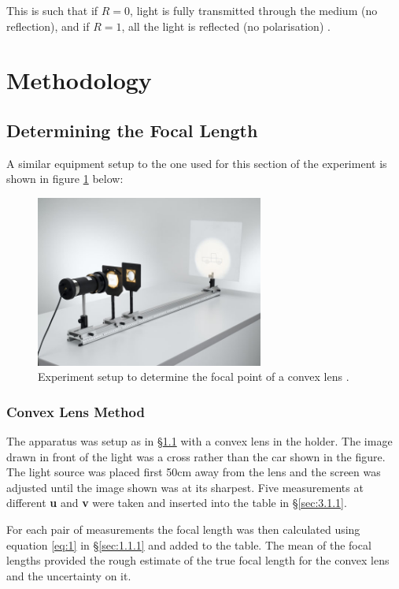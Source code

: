 \documentclass[12pt]{article}
\begin{document}
\vspace{.5cm}

This is such that if $R=0$, light is fully transmitted through the medium (no reflection), and if $R=1$, all the light is reflected (no polarisation)
\cite{UCDlens}.

\section{Methodology} \label{sec:2}

\subsection{Determining the Focal Length} \label{sec:2.1}

A similar equipment setup to the one used for this section of the experiment is shown in figure \ref{fig:lensexp} below:

\begin{figure}[H]
    \centering
    \includegraphics[width=7.5cm]{lens exp setup.jpg}
    \caption{\centering Experiment setup to determine the focal point of a convex lens \protect\cite{leyboldexp}.}
    \label{fig:lensexp}
\end{figure}

\subsubsection{Convex Lens Method} \label{sec:2.1.1}

The apparatus was setup as in §\ref{sec:2.1} with a convex lens in the holder. The image drawn in front of the light was a cross rather than the car shown in the figure.
The light source was placed first 50cm away from the lens and the screen was adjusted until the image shown was at its sharpest.
Five measurements at different \textbf{u} and \textbf{v} were taken and inserted into the table in §\ref{sec:3.1.1}.

For each pair of measurements the focal length was then calculated using equation \ref{eq:1} in §\ref{sec:1.1.1} and added to the table.
The mean of the focal lengths provided the rough estimate of the true focal length for the convex lens and the uncertainty on it.
\end{document}
